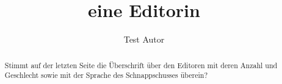 \documentclass{snapshotmfo}
\author{Test Autor}
\title{eine Editorin}
\begin{document}
\begin{abstract}
Stimmt auf der letzten Seite die Überschrift über den Editoren mit deren Anzahl und Geschlecht sowie mit 
der Sprache des Schnappschusses überein?
\end{abstract}
\end{document}
